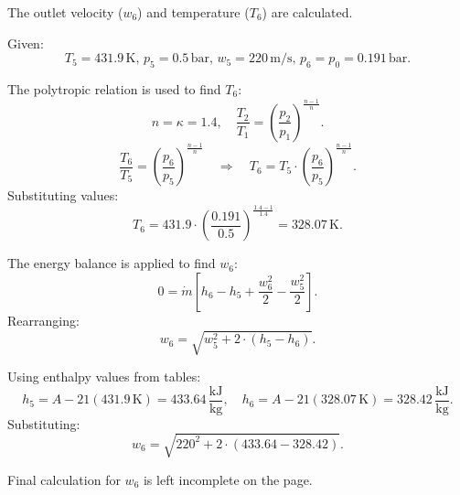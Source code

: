The outlet velocity (\( w_6 \)) and temperature (\( T_6 \)) are calculated.  

Given:  
\[
T_5 = 431.9 \, \text{K}, \, p_5 = 0.5 \, \text{bar}, \, w_5 = 220 \, \text{m/s}, \, p_6 = p_0 = 0.191 \, \text{bar}.
\]  

The polytropic relation is used to find \( T_6 \):  
\[
n = \kappa = 1.4, \quad \frac{T_2}{T_1} = \left( \frac{p_2}{p_1} \right)^{\frac{n-1}{n}}.
\]  
\[
\frac{T_6}{T_5} = \left( \frac{p_6}{p_5} \right)^{\frac{n-1}{n}} \quad \Rightarrow \quad T_6 = T_5 \cdot \left( \frac{p_6}{p_5} \right)^{\frac{n-1}{n}}.
\]  
Substituting values:  
\[
T_6 = 431.9 \cdot \left( \frac{0.191}{0.5} \right)^{\frac{1.4-1}{1.4}} = 328.07 \, \text{K}.
\]  

The energy balance is applied to find \( w_6 \):  
\[
0 = \dot{m} \left[ h_6 - h_5 + \frac{w_6^2}{2} - \frac{w_5^2}{2} \right].
\]  
Rearranging:  
\[
w_6 = \sqrt{w_5^2 + 2 \cdot (h_5 - h_6)}.
\]  

Using enthalpy values from tables:  
\[
h_5 = A-21(431.9 \, \text{K}) = 433.64 \, \frac{\text{kJ}}{\text{kg}}, \quad h_6 = A-21(328.07 \, \text{K}) = 328.42 \, \frac{\text{kJ}}{\text{kg}}.
\]  
Substituting:  
\[
w_6 = \sqrt{220^2 + 2 \cdot (433.64 - 328.42)}.
\]  

Final calculation for \( w_6 \) is left incomplete on the page.